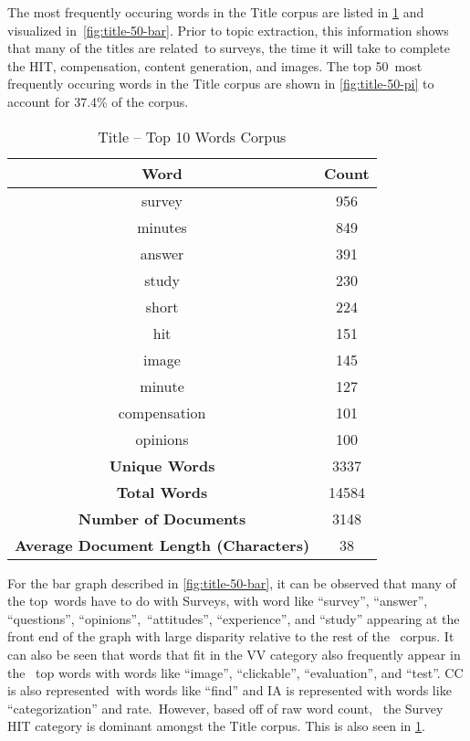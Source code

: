 \documentclass[letterpaper,12pt]{article}
\begin{document}
The most frequently occuring words in the Title corpus are listed in \ref{tab:title_top_words} and visualized in\
\ref{fig:title-50-bar}. Prior to topic extraction, this information shows that many of the titles are related\
to surveys, the time it will take to complete the HIT, compensation, content generation, and images. The top 50\
most frequently occuring words in the Title corpus are shown in \ref{fig:title-50-pi} to account for 37.4\%
of the corpus.

\begin{table}
	\caption{\label{tab:title_top_words} Title -- Top 10 Words Corpus}
	\begin{center}
		\begin{tabular}{|c|c|}
			\hline
			\textbf{Word} & \textbf{Count} \\
			\hline
			survey & 956 \\
			\hline
			minutes & 849 \\
			\hline
			answer & 391 \\
			\hline
			study & 230 \\
			\hline
			short & 224 \\
			\hline
			hit & 151 \\
			\hline
			image & 145 \\
			\hline
			minute & 127 \\
			\hline
			compensation & 101 \\
			\hline
			opinions & 100 \\
			\hline
			\textbf{Unique Words} & 3337 \\
			\hline
			\textbf{Total Words} & 14584 \\
			\hline
			\textbf{Number of Documents} & 3148 \\
			\hline
			\textbf{Average Document Length (Characters)} & 38 \\
			\hline
		\end{tabular}
	\end{center}
\end{table}

For the bar graph described in \ref{fig:title-50-bar}, it can be observed that many of the top\
words have to do with Surveys, with word like ``survey'', ``answer'', ``questions'', ``opinions'',\
``attitudes'', ``experience'', and ``study'' appearing at the front end of the graph with large disparity relative to the rest of the \
corpus. It can also be seen that words that fit in the VV category also frequently appear in the \
top words with words like ``image'', ``clickable'', ``evaluation'', and ``test''. CC is also represented\
with words like ``find'' and IA is represented with words like ``categorization'' and rate.\ However, based off of raw word count, \
the Survey HIT category is dominant amongst the Title corpus. This is also seen in \ref{tab:title_top_words}.
\end{document}
